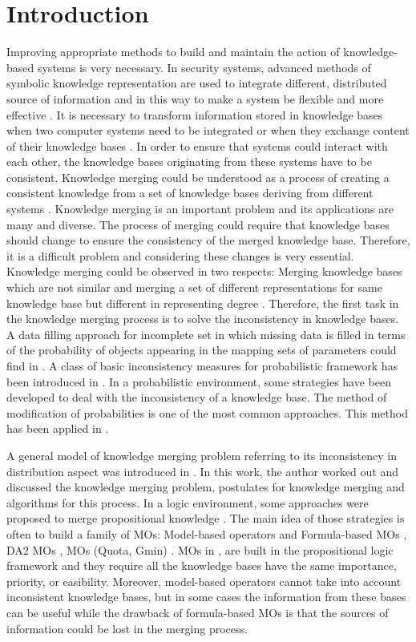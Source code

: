 \documentclass[]{iosart2c}
\begin{document}
  \thispagestyle{empty}
  \pagestyle{empty}


  \section{Introduction}
  Improving appropriate methods to build and maintain the action of knowledge-based systems is very necessary. In
  security systems, advanced methods of symbolic knowledge representation are used to integrate different, distributed
  source of information and in this way to make a system be flexible and more effective \cite{1}. It is necessary to
  transform information stored in knowledge bases when two computer systems need to be integrated or when they exchange
  content of their knowledge bases \cite{2}. In order to ensure that systems could interact with each other, the
  knowledge bases originating from these systems have to be consistent. Knowledge merging could be understood as a
  process of creating a consistent knowledge from a set of knowledge bases deriving from different systems \cite{3}.
  Knowledge merging is an important problem and its applications are many and diverse. The process of merging could
  require that knowledge bases should change to ensure the consistency of the merged knowledge base. Therefore, it is
  a difficult problem and considering these changes is very essential. Knowledge merging could be observed in two
  respects: Merging knowledge bases which are not similar and merging a set of different representations for same
  knowledge base but different in representing degree \cite{3}. Therefore, the first task in the knowledge merging
  process is to solve the inconsistency in knowledge bases. A data filling approach for incomplete set in which missing
  data is filled in terms of the probability of objects appearing in the mapping sets of parameters could find in
  \cite{4}. A class of basic inconsistency measures for probabilistic framework has been introduced in \cite{5}
  \cite{6}. In a probabilistic environment, some strategies have been developed to deal with the inconsistency of a
  knowledge base. The method of modification of probabilities is one of the most common approaches. This method has
  been applied in \cite{7} \cite{8} \cite{9} \cite{10}.

  A general model of knowledge merging problem referring to its inconsistency in distribution aspect was introduced in
  \cite{3}. In this work, the author worked out and discussed the knowledge merging problem, postulates for knowledge
  merging and algorithms for this process. In a logic environment, some approaches were proposed to merge propositional
  knowledge \cite{11} \cite{12} \cite{13}. The main idea of those strategies is often to build a family of MOs:
  Model-based operators and Formula-based MOs \cite{11}, DA2 MOs \cite{12}, MOs (Quota, Gmin) \cite{13}. MOs in
  \cite{11}, \cite{12} are built in the propositional logic framework and they require all the knowledge bases have the
  same importance, priority, or easibility. Moreover, model-based operators cannot take into account inconsistent
  knowledge bases, but in some cases the information from these bases can be useful while the drawback of formula-based
  MOs is that the sources of information could be lost in the merging process.
\end{document}
